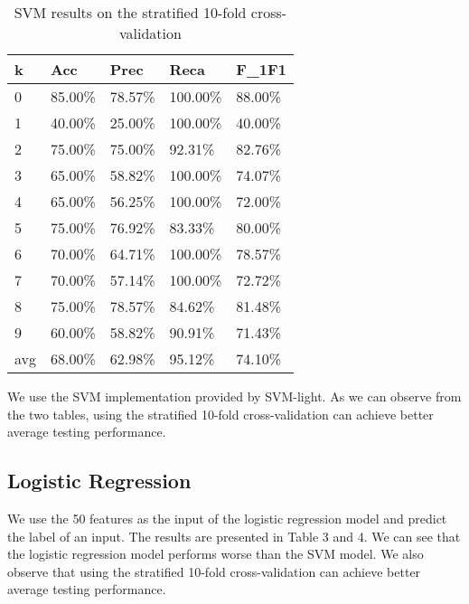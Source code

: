 \documentclass{article}
\begin{document}
	\begin{table}[h]
		\centering
		\caption{SVM results on the stratified 10-fold cross-validation}
		\begin{tabular}{|l|l|l|l|l|}
		\hline
		\textbf{k} & \textbf{Acc} & \textbf{Prec} & \textbf{Reca} & \textbf{F\_1F1} \\ \hline
		0          & 85.00\%      & 78.57\%       & 100.00\%      & 88.00\%         \\ \hline
		1          & 40.00\%      & 25.00\%       & 100.00\%      & 40.00\%         \\ \hline
		2          & 75.00\%      & 75.00\%       & 92.31\%       & 82.76\%         \\ \hline
		3          & 65.00\%      & 58.82\%       & 100.00\%      & 74.07\%         \\ \hline
		4          & 65.00\%      & 56.25\%       & 100.00\%      & 72.00\%         \\ \hline
		5          & 75.00\%      & 76.92\%       & 83.33\%       & 80.00\%         \\ \hline
		6          & 70.00\%      & 64.71\%       & 100.00\%      & 78.57\%         \\ \hline
		7          & 70.00\%      & 57.14\%       & 100.00\%      & 72.72\%         \\ \hline
		8          & 75.00\%      & 78.57\%       & 84.62\%       & 81.48\%         \\ \hline
		9          & 60.00\%      & 58.82\%       & 90.91\%       & 71.43\%         \\ \hline
		avg        & 68.00\%      & 62.98\%       & 95.12\%       & 74.10\%         \\ \hline
		\end{tabular}
		\end{table}

We use the SVM implementation provided by SVM-light. As we can observe from the two tables, using the stratified 10-fold cross-validation can achieve better average testing performance. 

\subsection*{Logistic Regression}

We use the 50 features as the input of the logistic regression model and predict the label of an input. The results are presented in Table 3 and 4. We can see that the logistic regression model performs worse than the SVM model. We also observe that using the stratified 10-fold cross-validation can achieve better average testing performance. 
\end{document}
